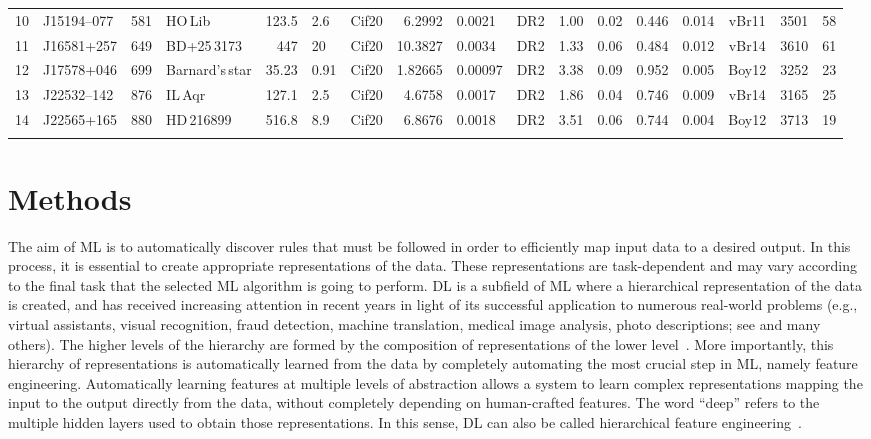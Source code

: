 \documentclass{aa}
\begin{document}
\begin{table*}
\begin{tabular}{llllr@{\,$\pm$\,}lcr@{\,$\pm$\,}lcr@{\,$\pm$\,}lr@{\,$\pm$\,}lcr@{\,$\pm$\,}l}
 10 & J15194--077 &  581 &         HO\,Lib &  123.5 &  2.6 &     Cif20 &   6.2992 &   0.0021 &  DR2 &  1.00 & 0.02 & 0.446 & 0.014 & vBr11 & 3501   & 58 \\
 11 & J16581+257 &  649 &     BD+25\,3173 &  447   & 20   &     Cif20 &  10.3827 &   0.0034 &  DR2 &  1.33 & 0.06 & 0.484 & 0.012 & vBr14 & 3610   & 61 \\
 12 & J17578+046 &  699 & Barnard's\,star &  35.23 &  0.91 &     Cif20 &   1.82665 &   0.00097 &  DR2 &  3.38 & 0.09 & 0.952 & 0.005 & Boy12 & 3252   & 23 \\
 13 & J22532--142 &  876 &         IL\,Aqr &  127.1 &  2.5 &     Cif20 &   4.6758 &   0.0017 &  DR2 &  1.86 & 0.04 & 0.746 & 0.009 & vBr14 & 3165   & 25 \\
 14 & J22565+165 &  880 &      HD\,216899 &  516.8 &  8.9 &     Cif20 &   6.8676 &   0.0018 &  DR2 &  3.51 & 0.06 & 0.744 & 0.004 & Boy12 & 3713   & 19 \\
    \noalign{\smallskip}
    \hline
\end{tabular}%
\end{table*}


\section{Methods}
\label{Methods}

The aim of ML is to automatically discover rules that must be followed in order to efficiently map input data to a desired output. In this process, it is essential to create appropriate representations of the data. These representations are task-dependent and may vary according to the final task that the selected ML algorithm is going to perform.
DL is a subfield of ML where a hierarchical representation of the data is created, and has received increasing attention in recent years in light of its successful application to numerous real-world problems (e.g., virtual assistants, visual recognition, fraud detection, machine translation, medical image analysis, photo descriptions; see \citealt{Karpathy2015} and many others).
The higher levels of the hierarchy are formed by the composition of representations of the lower level~\citep{Passegger2020}. 
More importantly, this hierarchy of representations is automatically learned from the data by completely automating the most crucial step in ML, namely feature engineering. 
Automatically learning features at multiple levels of abstraction allows a system to learn complex representations mapping the input to the output directly from the data, without completely depending on human-crafted features.
The word ``deep'' refers to the multiple hidden layers used to obtain those representations. 
In this sense, DL can also be called hierarchical feature engineering~\citep{sarkar2018hands}.
\end{document}
